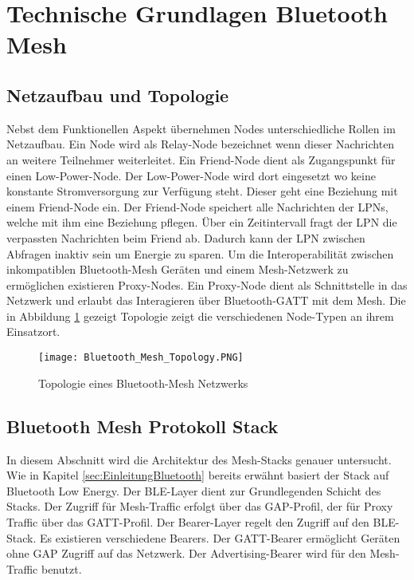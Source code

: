 \clearpage
\section{Technische Grundlagen Bluetooth Mesh}\label{sec:TechnischeGrundlagenBluetoothMesh}




\subsection{Netzaufbau und Topologie}\label{sec:NetzaufbauundTopologie}

Nebst dem Funktionellen Aspekt übernehmen Nodes unterschiedliche Rollen im Netzaufbau. Ein Node wird als Relay-Node bezeichnet wenn dieser Nachrichten an weitere Teilnehmer weiterleitet. Ein Friend-Node dient als Zugangspunkt für einen Low-Power-Node. Der Low-Power-Node wird dort eingesetzt wo keine konstante Stromversorgung zur Verfügung steht. Dieser geht eine Beziehung mit einem Friend-Node ein. Der Friend-Node speichert alle Nachrichten der LPNs, welche mit ihm eine Beziehung pflegen. Über ein Zeitintervall fragt der LPN die verpassten Nachrichten beim Friend ab. Dadurch kann der LPN zwischen Abfragen inaktiv sein um Energie zu sparen. Um die Interoperabilität zwischen inkompatiblen Bluetooth-Mesh Geräten und einem Mesh-Netzwerk zu ermöglichen existieren Proxy-Nodes. Ein Proxy-Node dient als Schnittstelle in das Netzwerk und erlaubt das Interagieren über Bluetooth-GATT mit dem Mesh. Die in Abbildung \ref{fig:BTMeshTopology} gezeigt Topologie zeigt die verschiedenen Node-Typen an ihrem Einsatzort. 

\begin{figure} [H]
	\centering
	\texttt{[image: Bluetooth\_Mesh\_Topology.PNG]}
	\caption{Topologie eines Bluetooth-Mesh Netzwerks \cite{bluetooth_sig_mesh_netzwerk_spezifikationen_2020}} 
	\label{fig:BTMeshTopology}
\end{figure}






\subsection{Bluetooth Mesh Protokoll Stack}\label{sec:BLEMeshProtokollStack}

In diesem Abschnitt wird die Architektur des Mesh-Stacks genauer untersucht. Wie in Kapitel \ref{sec:EinleitungBluetooth} bereits erwähnt basiert der Stack auf Bluetooth Low Energy. Der BLE-Layer dient zur Grundlegenden Schicht des Stacks. Der Zugriff für Mesh-Traffic erfolgt über das GAP-Profil, der für Proxy Traffic über das GATT-Profil. Der Bearer-Layer regelt den Zugriff auf den BLE-Stack. Es existieren verschiedene Bearers. Der GATT-Bearer ermöglicht Geräten ohne GAP Zugriff auf das Netzwerk. Der Advertising-Bearer wird für den Mesh-Traffic benutzt. \\

